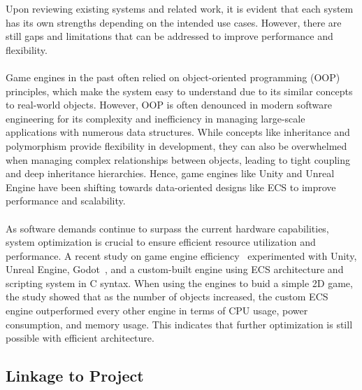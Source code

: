 Upon reviewing existing systems and related work, it is evident that each system has its own strengths depending 
on the intended use cases.
However, there are still gaps and limitations that can be addressed to improve performance and flexibility.
\\\\
Game engines in the past often relied on object-oriented programming (OOP) principles, which make the system easy to 
understand due to its similar concepts to real-world objects.
However, OOP is often denounced in modern software engineering for its complexity and inefficiency in managing 
large-scale applications with numerous data structures.
While concepts like inheritance and polymorphism provide flexibility in development, they can also be overwhelmed 
when managing complex relationships between objects, leading to tight coupling and deep inheritance hierarchies.
Hence, game engines like Unity and Unreal Engine have been shifting towards data-oriented designs like ECS to improve 
performance and scalability.
\\\\
As software demands continue to surpass the current hardware capabilities, system optimization is crucial to ensure 
efficient resource utilization and performance.
A recent study on game engine efficiency~\cite{Game_Engine_Efficiency} experimented with Unity, Unreal Engine, 
Godot~\cite{Godot_Engine}, and a custom-built engine using ECS architecture and scripting system in C syntax.
When using the engines to buid a simple 2D game, the study showed that as the number of objects increased, the custom 
ECS engine outperformed every other engine in terms of CPU usage, power consumption, and memory usage.
This indicates that further optimization is still possible with efficient architecture.

\subsection{Linkage to Project}
\label{subsec:linkage-to-project}

